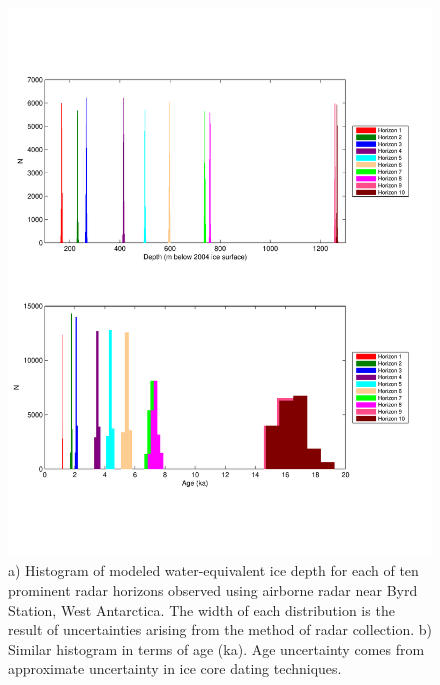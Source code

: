 \documentclass[12pt]{article}
\begin{document}
\begin{figure}[ht]
\begin{center}
\includegraphics[scale=0.59]{figures/agedepthhist_morland}
\captionsetup{width=.9\textwidth}
\caption{a) Histogram of modeled water-equivalent ice depth for each of ten prominent radar horizons observed using airborne radar near Byrd Station, West Antarctica. The width of each distribution is the result of uncertainties arising from the method of radar collection. b) Similar histogram in terms of age (ka). Age uncertainty comes from approximate uncertainty in ice core dating techniques. }
\label{fig:agedepthhist}
\end{center}
\end{figure}
\end{document}
